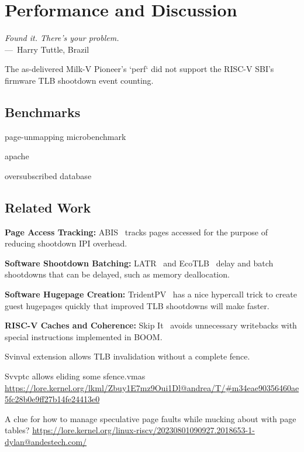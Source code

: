 
\chapter{Performance and Discussion}
\label{ch:discussion}

\begin{epigraph}
	\emph{Found it. There's your problem.}\\
	---~Harry Tuttle, Brazil
\end{epigraph}

The as-delivered Milk-V Pioneer's `perf` did not support the RISC-V SBI's firmware TLB shootdown event counting.

\section{Benchmarks}

page-unmapping microbenchmark

apache

oversubscribed database


\section{Related Work}
\textbf{Page Access Tracking:} ABIS~\cite{amit_optimizing_2017} tracks pages accessed for the purpose of reducing shootdown IPI overhead.

\textbf{Software Shootdown Batching:} LATR~\cite{kumar_latr_2018} and EcoTLB~\cite{maass_ecotlb_2020} delay and batch shootdowns that can be delayed, such as memory deallocation.

\textbf{Software Hugepage Creation:} TridentPV~\cite{ram_trident_2021} has a nice hypercall trick to create guest hugepages quickly that improved TLB shootdowns will make faster.

\textbf{RISC-V Caches and Coherence:} Skip It~\cite{anand_skip_2024} avoids unnecessary writebacks with special instructions implemented in BOOM.

Svinval extension allows TLB invalidation without a complete fence.

Svvptc allows eliding some sfence.vmas \url{https://lore.kernel.org/lkml/Zbuy1E7mz9Oui1Dl@andrea/T/#m34eae90356460ae5fc28b0e9ff27b14fe24413e0}

A clue for how to manage speculative page faults while mucking about with page tables? \url{https://lore.kernel.org/linux-riscv/20230801090927.2018653-1-dylan@andestech.com/}

